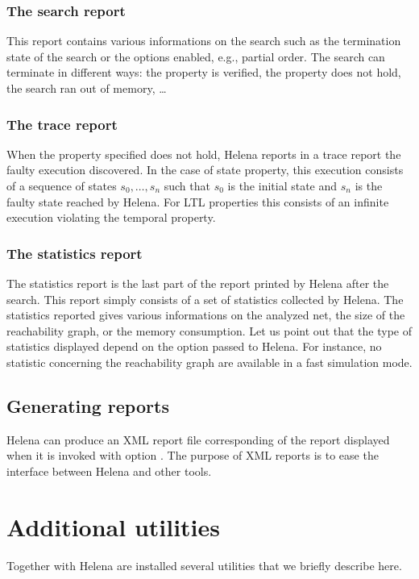 \subsubsection{The search report}
This report contains various informations on the search such as the
termination state of the search or the options enabled, e.g., partial
order. The search can terminate in different ways: the property is
verified, the property does not hold, the search ran out of memory,
\ldots

\subsubsection{The trace report}
When the property specified does not hold, Helena reports in a trace
report the faulty execution discovered.  In the case of state
property, this execution consists of a sequence of states $s_0, \dots,
s_n$ such that $s_0$ is the initial state and $s_n$ is the faulty
state reached by Helena.  For LTL properties this consists of an
infinite execution violating the temporal property.

\subsubsection{The statistics report}
The statistics report is the last part of the report printed by Helena
after the search.  This report simply consists of a set of statistics
collected by Helena. The statistics reported gives various
informations on the analyzed net, the size of the reachability graph,
or the memory consumption.  Let us point out that the type of
statistics displayed depend on the option passed to Helena.  For
instance, no statistic concerning the reachability graph are available
in a fast simulation mode.
\subsection{Generating reports}
Helena can produce an XML report file corresponding of the report
displayed when it is invoked with option .  The
purpose of XML reports is to ease the interface between Helena and
other tools.
\section{Additional utilities}
\label{section_utilities}
Together with Helena are installed several utilities that we briefly
describe here.
